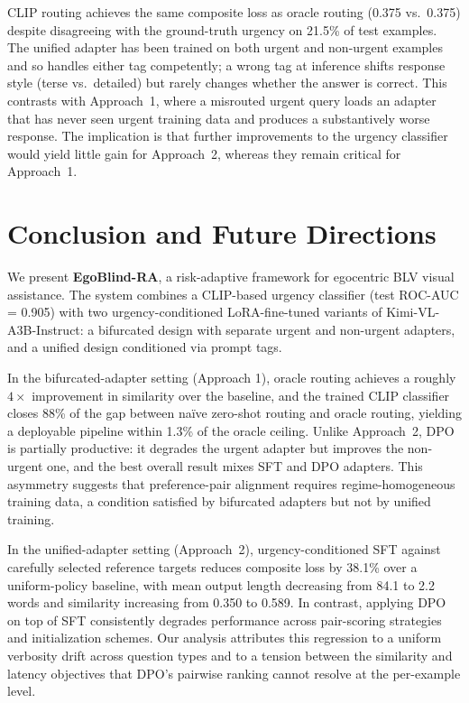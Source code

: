 \documentclass{article}
\begin{document}
CLIP routing achieves the same composite loss as oracle routing (0.375 vs.\ 0.375) despite disagreeing with the ground-truth urgency on 21.5\% of test examples. The unified adapter has been trained on both urgent and non-urgent examples and so handles either tag competently; a wrong tag at inference shifts response style (terse vs.\ detailed) but rarely changes whether the answer is correct. This contrasts with Approach~1, where a misrouted urgent query loads an adapter that has never seen urgent training data and produces a substantively worse response. The implication is that further improvements to the urgency classifier would yield little gain for Approach~2, whereas they remain critical for Approach~1.

\section{Conclusion and Future Directions}\label{sec:conclusion}
We present \textbf{EgoBlind-RA}, a risk-adaptive framework for egocentric BLV visual assistance. The system combines a CLIP-based urgency classifier (test ROC-AUC = 0.905) with two urgency-conditioned LoRA-fine-tuned variants of Kimi-VL-A3B-Instruct: a bifurcated design with separate urgent and non-urgent adapters, and a unified design conditioned via prompt tags.

In the bifurcated-adapter setting (Approach 1), oracle routing achieves a roughly $4\times$ improvement in similarity over the baseline, and the trained CLIP classifier closes 88\% of the gap between na\"ive zero-shot routing and oracle routing, yielding a deployable pipeline within 1.3\% of the oracle ceiling. Unlike Approach~2, DPO is partially productive: it degrades the urgent adapter but improves the non-urgent one, and the best overall result mixes SFT and DPO adapters. This asymmetry suggests that preference-pair alignment requires regime-homogeneous training data, a condition satisfied by bifurcated adapters but not by unified training.

In the unified-adapter setting (Approach~2), urgency-conditioned SFT against carefully selected reference targets reduces composite loss by 38.1\% over a uniform-policy baseline, with mean output length decreasing from 84.1 to 2.2 words and similarity increasing from 0.350 to 0.589. In contrast, applying DPO on top of SFT consistently degrades performance across pair-scoring strategies and initialization schemes. Our analysis attributes this regression to a uniform verbosity drift across question types and to a tension between the similarity and latency objectives that DPO's pairwise ranking cannot resolve at the per-example level.
\end{document}
